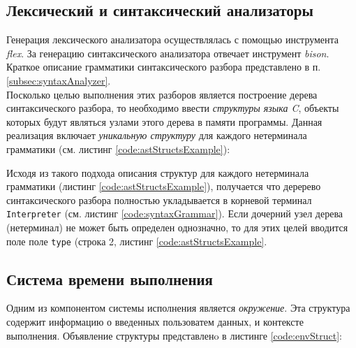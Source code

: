 \documentclass[12pt]{article}
\begin{document}
		\subsection{Лексический и синтаксический анализаторы}
			\hspace{\parindent}Генерация лексического анализатора осуществлялась с помощью инструмента {\it flex}.
			\indent За генерацию синтаксического анализатора отвечает инструмент {\it bison}. Краткое описание грамматики синтаксического разбора представлено в п. \ref{subsec:syntaxAnalyzer}. \\
			\indent Посколько целью выполнения этих разборов является построение дерева синтаксического разбора, то необходимо ввести {\it структуры языка C}, объекты которых будут являться узлами этого дерева в памяти программы. Данная реализация включает {\it уникальную структуру} для каждого нетерминала грамматики (см. листинг \ref{code:astStructsExample}):
			
			
			\indent Исходя из такого подхода описания структур для каждого нетерминала грамматики (листинг \ref{code:astStructsExample}), получается что деререво синтаксического разбора полностью укладывается в корневой терминал {\tt Interpreter} (см. листинг \ref{code:syntaxGrammar}). Если дочерний узел дерева (нетерминал) не может быть определен однозначно, то для этих целей вводится поле поле {\tt type} (строка 2, листинг \ref{code:astStructsExample}. 
		\subsection{Система времени выполнения}
			\hspace{\parindent} Одним из компонентом системы исполнения является {\it окружение}. Эта структура содержит информацию о введенных пользоватем данных, и контексте выполнения. Объявление структуры представленo в листинге \ref{code:envStruct}:
			
			
\end{document}
